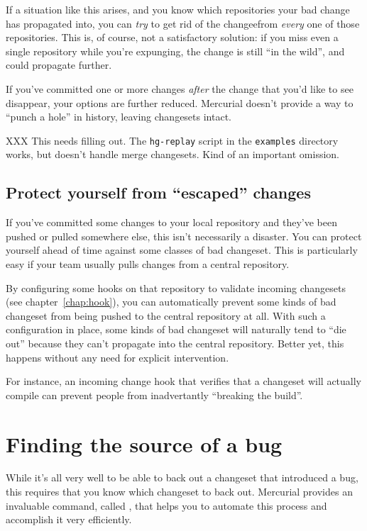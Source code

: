 If a situation like this arises, and you know which repositories your
bad change has propagated into, you can \emph{try} to get rid of the
changeefrom \emph{every} one of those repositories.  This is, of
course, not a satisfactory solution: if you miss even a single
repository while you're expunging, the change is still ``in the
wild'', and could propagate further.

If you've committed one or more changes \emph{after} the change that
you'd like to see disappear, your options are further reduced.
Mercurial doesn't provide a way to ``punch a hole'' in history,
leaving changesets intact.

XXX This needs filling out.  The \texttt{hg-replay} script in the
\texttt{examples} directory works, but doesn't handle merge
changesets.  Kind of an important omission.

\subsection{Protect yourself from ``escaped'' changes}

If you've committed some changes to your local repository and they've
been pushed or pulled somewhere else, this isn't necessarily a
disaster.  You can protect yourself ahead of time against some classes
of bad changeset.  This is particularly easy if your team usually
pulls changes from a central repository.

By configuring some hooks on that repository to validate incoming
changesets (see chapter~\ref{chap:hook}), you can automatically
prevent some kinds of bad changeset from being pushed to the central
repository at all.  With such a configuration in place, some kinds of
bad changeset will naturally tend to ``die out'' because they can't
propagate into the central repository.  Better yet, this happens
without any need for explicit intervention.

For instance, an incoming change hook that verifies that a changeset
will actually compile can prevent people from inadvertantly ``breaking
the build''.

\section{Finding the source of a bug}
\label{sec:undo:bisect}

While it's all very well to be able to back out a changeset that
introduced a bug, this requires that you know which changeset to back
out.  Mercurial provides an invaluable command, called
, that helps you to automate this process and accomplish
it very efficiently.

